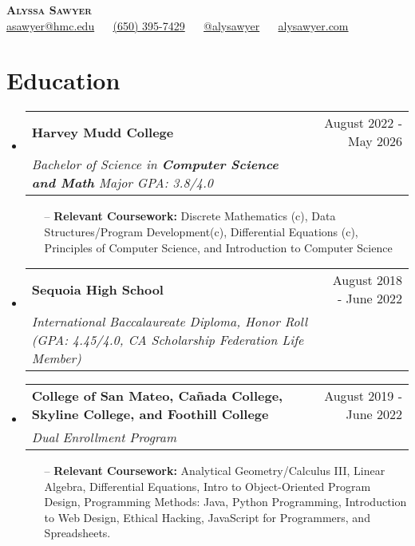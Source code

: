 \documentclass[letterpaper,10pt]{article}
\makeatletter
\newcommand{\resumeSubheading}[4]{
  \vspace{-2pt}\item
    \begin{tabular*}{0.97\textwidth}[t]{l@{\extracolsep{\fill}}r}
      \textbf{#1} & #2 \\
      \textit{\small#3} & \textit{\small #4} \\
    \end{tabular*}\vspace{-7pt}
}
\newcommand{\resumeSubHeadingListStart}{\begin{itemize}[leftmargin=0.15in, label={}]}
\newcommand{\resumeSubHeadingListEnd}{\end{itemize}}
\makeatother
\begin{document}
\begin{center}
    \textbf{\huge \scshape Alyssa Sawyer} \\ \vspace{3pt}
    \faEnvelope{} \href{asawyer@hmc.edu}{asawyer@hmc.edu} $\quad$ 
    \faPhone{} \href{tel:6503957429}{(650) 395-7429} $\quad$
    \faLinkedin{} \href{https://www.linkedin.com/in/alysawyer/}{@alysawyer} $\quad$
    \faGlobe{} \href{https://alysawyer.com}{alysawyer.com} $\quad$
\end{center}


\section{Education}
  \resumeSubHeadingListStart
    \resumeSubheading
      {Harvey Mudd College}{August 2022 - May 2026}
      {Bachelor of Science in \textbf{Computer Science and Math} Major GPA: 3.8/4.0}{}
        \begin{itemize}\small
        \setlength\itemsep{0em}
            \item[--] \textbf{Relevant Coursework:} Discrete Mathematics (c), Data Structures/Program Development(c), Differential Equations (c), Principles of Computer Science, and Introduction to Computer Science
        \end{itemize}
    \vspace{-5pt}
    \resumeSubheading
      {Sequoia High School}{August 2018 - June 2022}
      {International Baccalaureate Diploma, Honor Roll (GPA: 4.45/4.0, CA Scholarship Federation Life Member)}{} 
    \vspace{5pt}
    \resumeSubheading
      {College of San Mateo, Cañada College, Skyline College, and Foothill College}{August 2019 - June 2022}
      {Dual Enrollment Program}{}
        \begin{itemize}\small
        \setlength\itemsep{0em}
            \item[--] \textbf{Relevant Coursework:} Analytical Geometry/Calculus III, Linear Algebra, Differential Equations, Intro to Object-Oriented Program Design, Programming Methods: Java, Python Programming,
Introduction to Web Design, Ethical Hacking, JavaScript for Programmers, and Spreadsheets.
        \end{itemize}    
        
        
  \resumeSubHeadingListEnd
\end{document}

